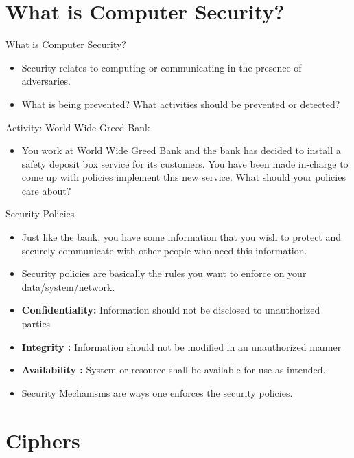 \documentclass{beamer}
\begin{document}
\section{What is Computer Security?}

\begin{frame}{What is Computer Security?}
    \begin{itemize}
        \item Security relates to computing or communicating in the presence of adversaries.
        \item What is being prevented? What activities should be prevented or detected?
    \end{itemize}
\end{frame}

\begin{frame}{Activity: World Wide Greed Bank}
    \begin{itemize}
        \item You work at World Wide Greed Bank and the bank has decided to install a safety deposit box service for its customers. You have been made in-charge to come up with policies implement this new service. What should your policies care about?
    \end{itemize}
\end{frame}

\begin{frame}{Security Policies}
    \begin{itemize}
        \item Just like the bank, you have some information that you wish to protect and securely communicate with other people who need this information.
        \item Security policies are basically the rules you want to enforce on your data/system/network.
        \item \textbf{Confidentiality: } Information should not be disclosed to unauthorized parties
        \item \textbf{Integrity : } Information should not be modified in an unauthorized manner
        \item \textbf{Availability : } System or resource shall be available for use as intended.
        \item Security Mechanisms are ways one enforces the security policies.
    \end{itemize}
\end{frame}

\section{Ciphers}
\end{document}
